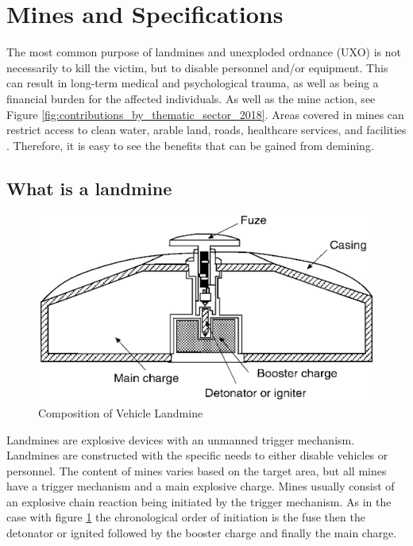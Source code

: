 \section{Mines and Specifications}

The most common purpose of landmines and unexploded ordnance (UXO) is not necessarily to kill the victim, but to disable personnel and/or equipment. This can result in long-term medical and psychological trauma, as well as being a financial burden for the affected individuals. As well as the mine action, see Figure \ref{fig:contributions_by_thematic_sector_2018}. Areas covered in mines can restrict access to clean water, arable land, roads, healthcare services, and facilities \cite{OxfordAcademic2005}. Therefore, it is easy to see the benefits that can be gained from demining. 

\subsection{What is a landmine}

\begin{figure}
\vspace{-8mm}
\centering
\includegraphics[width=\linewidth]{00 - Images/composition of vehicle landmine.png}
  \caption{Composition of Vehicle Landmine \cite{NAP10071}}
  \label{fig:comp_veh_mine}
\end{figure}

Landmines are explosive devices with an unmanned trigger mechanism. Landmines are constructed with the specific needs to either disable vehicles or personnel. The content of mines varies based on the target area, but all mines have a trigger mechanism and a main explosive charge. Mines usually consist of an explosive chain reaction being initiated by the trigger mechanism. As in the case with figure \ref{fig:comp_veh_mine} the chronological order of initiation is the fuse then the detonator or ignited followed by the booster charge and finally the main charge. \cite{NAP10071}

